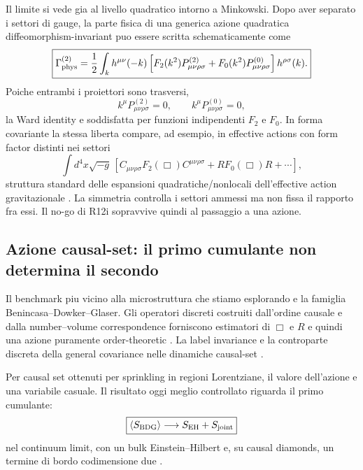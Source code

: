 \documentclass[11pt,a4paper]{article}
\begin{document}
Il limite si vede gia al livello quadratico intorno a Minkowski. Dopo aver separato i settori di gauge, la parte fisica di una generica azione quadratica diffeomorphism-invariant puo essere scritta schematicamente come
\begin{equation}
 \boxed{
 \Gamma_{\rm phys}^{(2)}
 =\frac12\int_k h^{\mu\nu}(-k)
 \left[
 F_2(k^2)P^{(2)}_{\mu\nu\rho\sigma}
 +F_0(k^2)P^{(0)}_{\mu\nu\rho\sigma}
 \right]
 h^{\rho\sigma}(k).
 }
 \label{eq:r12j_quadratic_action}
\end{equation}
Poiche entrambi i proiettori sono trasversi,
\begin{equation}
 k^\mu P^{(2)}_{\mu\nu\rho\sigma}=0,
 \qquad
 k^\mu P^{(0)}_{\mu\nu\rho\sigma}=0,
\end{equation}
la Ward identity e soddisfatta per funzioni indipendenti $F_2$ e $F_0$. In forma covariante la stessa liberta compare, ad esempio, in effective actions con form factor distinti nei settori
\begin{equation}
 \int d^4x\sqrt{-g}\,
 \left[
 C_{\mu\nu\rho\sigma}F_2(\Box)C^{\mu\nu\rho\sigma}
 +R F_0(\Box)R+\cdots
 \right],
 \label{eq:r12j_covariant_formfactors}
\end{equation}
struttura standard delle espansioni quadratiche/nonlocali dell'effective action gravitazionale \cite{FranchinoVinas2019}. La simmetria controlla i settori ammessi ma non fissa il rapporto fra essi. Il no-go di R12i sopravvive quindi al passaggio a una azione.

\subsection{Azione causal-set: il primo cumulante non determina il secondo}

Il benchmark piu vicino alla microstruttura che stiamo esplorando e la famiglia Benincasa--Dowker--Glaser. Gli operatori discreti costruiti dall'ordine causale e dalla number--volume correspondence forniscono estimatori di $\Box$ e $R$ e quindi una azione puramente order-theoretic \cite{BenincasaDowker2010,DowkerGlaser2013}. La label invariance e la controparte discreta della general covariance nelle dinamiche causal-set \cite{RideoutSorkin2000}.

Per causal set ottenuti per sprinkling in regioni Lorentziane, il valore dell'azione e una variabile casuale. Il risultato oggi meglio controllato riguarda il primo cumulante:
\begin{equation}
 \boxed{
 \langle S_{\rm BDG}\rangle
 \longrightarrow
 S_{\rm EH}+S_{\rm joint}
 }
 \label{eq:r12j_bdg_mean}
\end{equation}
nel continuum limit, con un bulk Einstein--Hilbert e, su causal diamonds, un termine di bordo codimensione due \cite{MachetWang2021}.
\end{document}
